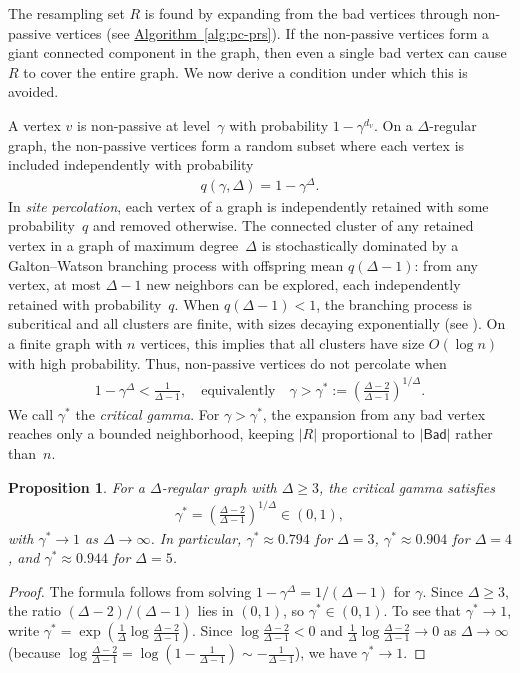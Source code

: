 \documentclass[12pt, a4paper]{article}
\theoremstyle{plain}
\newtheorem{proposition}{Proposition}
\theoremstyle{definition}
\theoremstyle{remark}
\newcommand{\lt}{\left}
\newcommand{\rt}{\right}
\newcommand{\sref}[2]{\hyperref[#2]{#1~\ref*{#2}}}
\newcommand{\bad}{\mathsf{Bad}}
\begin{document}
The resampling set \(R\) is found by expanding from the bad vertices through non-passive vertices (see \sref{Algorithm}{alg:pc-prs}). If the non-passive vertices form a giant connected component in the graph, then even a single bad vertex can cause \(R\) to cover the entire graph. We now derive a condition under which this is avoided.

A vertex \(v\) is non-passive at level~\(\gamma\) with probability \(1-\gamma^{d_v}\). On a \(\Delta\)-regular graph, the non-passive vertices form a random subset where each vertex is included independently with probability
\begin{align}\label{eqn:q_nonpassive}
q(\gamma,\Delta) = 1-\gamma^{\Delta}.
\end{align}
In {\em site percolation}, each vertex of a graph is independently retained with some probability~\(q\) and removed otherwise. The connected cluster of any retained vertex in a graph of maximum degree~\(\Delta\) is stochastically dominated by a Galton--Watson branching process with offspring mean \(q(\Delta-1)\): from any vertex, at most \(\Delta-1\) new neighbors can be explored, each independently retained with probability~\(q\). When \(q(\Delta-1)<1\), the branching process is subcritical and all clusters are finite, with sizes decaying exponentially (see \cite[Section~10.1, Theorem~6.75]{Grimm99}). On a finite graph with \(n\) vertices, this implies that all clusters have size \(O(\log n)\) with high probability. Thus, non-passive vertices do not percolate when
\begin{align}\label{eqn:non-perc}
1 - \gamma^{\Delta} < \frac{1}{\Delta - 1}, \quad\text{equivalently}\quad \gamma > \gamma^* := \left(\frac{\Delta - 2}{\Delta - 1}\right)^{1/\Delta}.
\end{align}
We call \(\gamma^*\) the {\em critical gamma}. For \(\gamma > \gamma^*\), the expansion from any bad vertex reaches only a bounded neighborhood, keeping \(|R|\) proportional to \(|\bad|\) rather than~\(n\).

\begin{proposition}\label{prop:gamma_crit}
For a \(\Delta\)-regular graph with \(\Delta\geq3\), the critical gamma satisfies
\begin{align}
\gamma^* = \left(\frac{\Delta-2}{\Delta-1}\right)^{1/\Delta} \in (0,1),
\end{align}
with \(\gamma^*\to1\) as \(\Delta\to\infty\). In particular, \(\gamma^*\approx0.794\) for \(\Delta=3\), \(\gamma^*\approx0.904\) for \(\Delta=4\), and \(\gamma^*\approx0.944\) for \(\Delta=5\).
\end{proposition}
\begin{proof}
The formula follows from solving \(1-\gamma^\Delta = 1/(\Delta-1)\) for \(\gamma\). Since \(\Delta\geq3\), the ratio \((\Delta-2)/(\Delta-1)\) lies in \((0,1)\), so \(\gamma^*\in(0,1)\). To see that \(\gamma^*\to1\), write \(\gamma^* = \exp\!\lt(\frac{1}{\Delta}\log\frac{\Delta-2}{\Delta-1}\rt)\). Since \(\log\frac{\Delta-2}{\Delta-1}<0\) and \(\frac{1}{\Delta}\log\frac{\Delta-2}{\Delta-1}\to0\) as \(\Delta\to\infty\) (because \(\log\frac{\Delta-2}{\Delta-1}= \log(1-\frac{1}{\Delta-1})\sim -\frac{1}{\Delta-1}\)), we have \(\gamma^*\to1\).
\end{proof}
\end{document}
